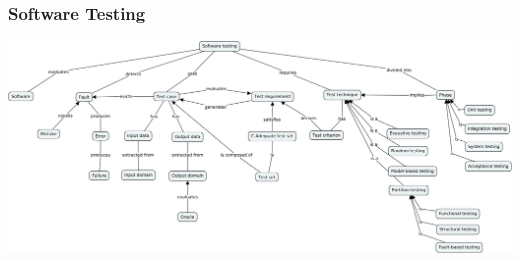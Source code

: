 \begin{frame}[c, plain]
\label{title}
\titlepage
\end{frame}

%

\begin{frame}[c,parent={title}, hasprev=false, hasnext=false]
\frametitle{Software Testing}
\label{cmap:software-testing}

\centering
\includegraphics[width=\textwidth]{../BasicConcepts/Software testing fundamentals.png}
\end{frame}
